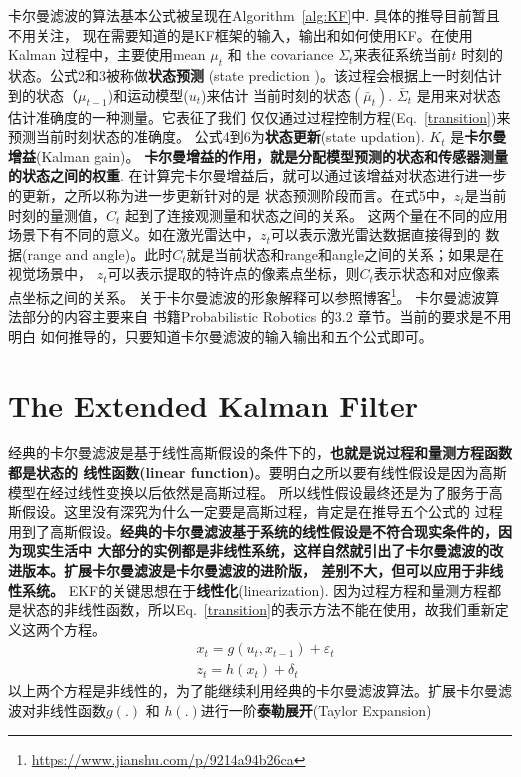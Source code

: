 \documentclass[UTF8,a4paper,10pt]{ctexart}
\begin{document}
卡尔曼滤波的算法基本公式被呈现在Algorithm~\ref{alg:KF}中. 具体的推导目前暂且不用关注，
现在需要知道的是KF框架的输入，输出和如何使用KF。在使用Kalman 过程中，主要使用mean $\mu_t$ 
和 the covariance $\Sigma_t$来表征系统当前$t$ 时刻的状态。公式2和3被称做{\bfseries 状态预测}
(state prediction )。该过程会根据上一时刻估计到的状态（$\mu_{t-1}$)和运动模型($u_{t}$)来估计
当前时刻的状态$(\bar{\mu}_t)$. $\bar{\Sigma}_t$ 是用来对状态估计准确度的一种测量。它表征了我们
仅仅通过过程控制方程(Eq.~\eqref{transition})来预测当前时刻状态的准确度。
公式4到6为{\bfseries 状态更新}(state updation). $K_t$ 是{\bfseries 卡尔曼增益}(Kalman gain)。
{\bfseries 卡尔曼增益的作用，就是分配模型预测的状态和传感器测量的状态之间的权重}. 
在计算完卡尔曼增益后，就可以通过该增益对状态进行进一步的更新，之所以称为进一步更新针对的是
状态预测阶段而言。在式5中，$z_t$是当前时刻的量测值，$C_t$ 起到了连接观测量和状态之间的关系。
这两个量在不同的应用场景下有不同的意义。如在激光雷达中，$z_t$可以表示激光雷达数据直接得到的
数据(range and angle)。此时$C_t$就是当前状态和range和angle之间的关系；如果是在视觉场景中，
$z_t$可以表示提取的特许点的像素点坐标，则$C_t$表示状态和对应像素点坐标之间的关系。
关于卡尔曼滤波的形象解释可以参照博客\footnote{\url{https://www.jianshu.com/p/9214a94b26ca}}。
卡尔曼滤波算法部分的内容主要来自 书籍Probabilistic Robotics 的3.2 章节。当前的要求是不用明白
如何推导的，只要知道卡尔曼滤波的输入输出和五个公式即可。

\section{The Extended Kalman Filter}
经典的卡尔曼滤波是基于线性高斯假设的条件下的，{\bfseries 也就是说过程和量测方程函数都是状态的
线性函数(linear function)}。要明白之所以要有线性假设是因为高斯模型在经过线性变换以后依然是高斯过程。
所以线性假设最终还是为了服务于高斯假设。这里没有深究为什么一定要是高斯过程，肯定是在推导五个公式的
过程用到了高斯假设。{\bfseries 经典的卡尔曼滤波基于系统的线性假设是不符合现实条件的，因为现实生活中
大部分的实例都是非线性系统，这样自然就引出了卡尔曼滤波的改进版本。扩展卡尔曼滤波是卡尔曼滤波的进阶版，
差别不大，但可以应用于非线性系统。} EKF的关键思想在于{\bfseries 线性化}(linearization). 因为过程方程和量测方程都是状态的非线性函数，所以Eq.~\eqref{transition}的表示方法不能在使用，故我们重新定义这两个方程。
\begin{align}
& x_t = g(u_t,x_{t-1})+\varepsilon_t\\
& z_t = h(x_t)+\delta_t
\end{align}
以上两个方程是非线性的，为了能继续利用经典的卡尔曼滤波算法。扩展卡尔曼滤波对非线性函数$g(.)$ 和 $h(.)$进行一阶{\bfseries 泰勒展开}(Taylor Expansion)
\end{document}
